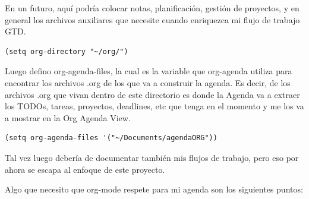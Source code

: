 \documentclass[11pt]{article}
\begin{document}
En un futuro, aquí podría colocar notas, planificación, gestión de proyectos, y en general los archivos auxiliares que necesite cuando enriquezca mi flujo de trabajo GTD.

\begin{verbatim}
(setq org-directory "~/org/")
\end{verbatim}

Luego defino org-agenda-files, la cual es la variable que org-agenda utiliza para encontrar los archivos .org de los que va a construir la agenda. Es decir, de los archivos .org que vivan dentro de este directorio es donde la Agenda va a extraer los TODOs, tareas, proyectos, deadlines, etc que tenga en el momento y me los va a mostrar en la Org Agenda View.

\begin{verbatim}
(setq org-agenda-files '("~/Documents/agendaORG"))
\end{verbatim}

Tal vez luego debería de documentar también mis flujos de trabajo, pero eso por ahora se escapa al enfoque de este proyecto.

Algo que necesito que org-mode respete para mi agenda son los siguientes puntos:
\end{document}

